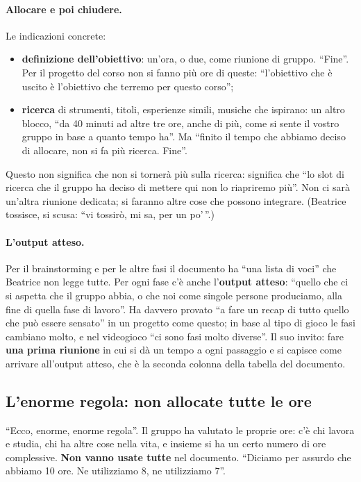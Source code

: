 \paragraph{Allocare e poi chiudere.} Le indicazioni concrete:
\begin{itemize}
  \item \textbf{definizione dell'obiettivo}: un'ora, o due, come riunione di
        gruppo. ``Fine''. Per il progetto del corso non si fanno più ore di queste:
        ``l'obiettivo che è uscito è l'obiettivo che terremo per questo corso'';
  \item \textbf{ricerca} di strumenti, titoli, esperienze simili, musiche che
        ispirano: un altro blocco, ``da 40 minuti ad altre tre ore, anche di più,
        come si sente il vostro gruppo in base a quanto tempo ha''. Ma ``finito il
        tempo che abbiamo deciso di allocare, non si fa più ricerca. Fine''.
\end{itemize}
Questo non significa che non si tornerà più sulla ricerca: significa che ``lo slot di
ricerca che il gruppo ha deciso di mettere qui non lo riapriremo più''. Non ci sarà
un'altra riunione dedicata; si faranno altre cose che possono integrare. (Beatrice
tossisce, si scusa: ``vi tossirò, mi sa, per un po'\,''.)

\paragraph{L'output atteso.} Per il brainstorming e per le altre fasi il documento ha
``una lista di voci'' che Beatrice non legge tutte. Per ogni fase c'è anche
l'\textbf{output atteso}: ``quello che ci si aspetta che il gruppo abbia, o che noi
come singole persone produciamo, alla fine di quella fase di lavoro''. Ha davvero
provato ``a fare un recap di tutto quello che può essere sensato'' in un progetto come
questo; in base al tipo di gioco le fasi cambiano molto, e nel videogioco ``ci sono
fasi molto diverse''. Il suo invito: fare \textbf{una prima riunione} in cui si dà un
tempo a ogni passaggio e si capisce come arrivare all'output atteso, che è la seconda
colonna della tabella del documento.

\subsection{L'enorme regola: non allocate tutte le ore}
\label{a9:sec:margine}

``Ecco, enorme, enorme regola''. Il gruppo ha valutato le proprie ore: c'è chi lavora
e studia, chi ha altre cose nella vita, e insieme si ha un certo numero di ore
complessive. \textbf{Non vanno usate tutte} nel documento. ``Diciamo per assurdo che
abbiamo 10 ore. Ne utilizziamo 8, ne utilizziamo 7''.

